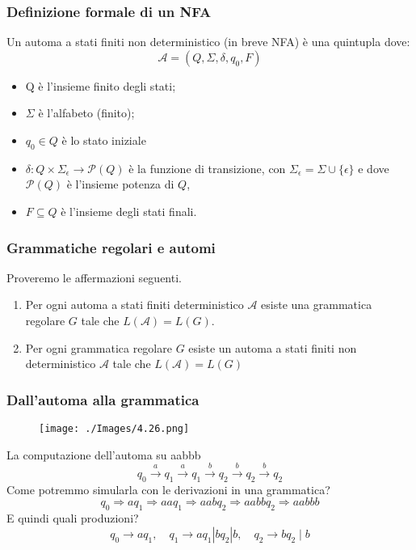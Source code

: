 \subsubsection{Definizione formale di un NFA}

Un automa a stati finiti non deterministico (in breve NFA) è una quintupla dove:
$$
\mathcal{A}=\left(Q, \Sigma, \delta, q_{0}, F\right)
$$
\begin{itemize}
    \item Q è l'insieme finito degli stati;
    \item $\Sigma$ è l'alfabeto (finito);
    \item $q_{0} \in Q$ è lo stato iniziale
    \item $\delta: Q \times \Sigma_{\epsilon} \rightarrow \mathcal{P}(Q)$ è la funzione di transizione, con $\Sigma_{\epsilon}=\Sigma \cup\{\epsilon\}$ e dove $\mathcal{P}(Q)$ è l'insieme potenza di $Q$,
    \item $F \subseteq Q$ è l'insieme degli stati finali.

\end{itemize}

\subsubsection{Grammatiche regolari e automi}
Proveremo le affermazioni seguenti.
\begin{enumerate}
    \item Per ogni automa a stati finiti deterministico $\mathcal{A}$ esiste una grammatica regolare $G$ tale che $L(\mathcal{A})=L(G)$.
    \item Per ogni grammatica regolare $G$ esiste un automa a stati finiti non deterministico $\mathcal{A}$ tale che $L(\mathcal{A})=L(G)$
\end{enumerate}

\subsubsection{Dall'automa alla grammatica}

\begin{figure}[hbpt!]
    \centering
    \texttt{[image: ./Images/4.26.png]}
\end{figure}
\FloatBarrier

La computazione dell'automa su aabbb
$$
q_{0} \stackrel{a}{\rightarrow} q_{1} \stackrel{a}{\rightarrow} q_{1} \stackrel{b}{\rightarrow} q_{2} \stackrel{b}{\rightarrow} q_{2} \stackrel{b}{\rightarrow} q_{2}
$$
Come potremmo simularla con le derivazioni in una grammatica?
$$
q_{0} \Rightarrow a q_{1} \Rightarrow a a q_{1} \Rightarrow a a b q_{2} \Rightarrow a a b b q_{2} \Rightarrow a a b b b
$$
E quindi quali produzioni?
$$
q_{0} \rightarrow a q_{1}, \quad q_{1} \rightarrow a q_{1}\left|b q_{2}\right| b, \quad q_{2} \rightarrow b q_{2} \mid b
$$

